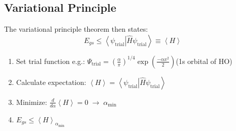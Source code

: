 \subsection{Variational Principle}
The variational principle theorem then states:
\begin{equation*}
    E_{gs}\leq\left\langle\psi_{\mathrm{trial}}\right|\widehat{H} \psi_{\mathrm{trial}}\left.\right\rangle \equiv \left<H\right>
\end{equation*}

\begin{enumerate}
    \item Set trial function e.g.: $\Psi_{\mathrm{trial}}={\left(\frac{\alpha}{\pi}\right)}^{1/4}\exp\left(\frac{-\alpha x^{2}}{2}\right)$\newline (1s orbital of HO)
    \item Calculate expectation: $\left\langle H\right\rangle= \left\langle\psi_{\mathrm{trial}}\right|\widehat{H} \psi_{\mathrm{trial}}\left.\right\rangle$
    \item Minimize: $\frac{d}{d \alpha} \left\langle H\right\rangle=0\;\to\; \alpha_{\min}$
    \item $E_{gs}\leq {\left\langle H \right\rangle}_{\alpha_{\min}}$
\end{enumerate}